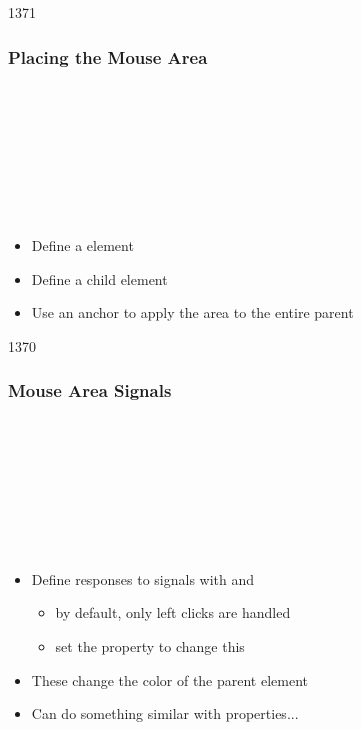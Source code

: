 
\begin{slide}{1371}\frametitle{Placing the Mouse Area}

\begin{qml}
\\
\\
\\
\\
\\
\\
\qtt{~~~~\}}\\
\qtt{\}}
\end{qml}

\begin{itemize}
\item Define a  element
\item Define a  child element
\item Use an anchor to apply the area to the entire parent
\end{itemize}

\end{slide}


\begin{slide}{1370}\frametitle{Mouse Area Signals}

\begin{qml}
\\
\\
\\
\\
\\
\\
\qtt{~~~~\}}\\
\qtt{\}}
\end{qml}

\begin{itemize}
\item Define responses to signals with  and 
  \begin{itemize}
  \item by default, only left clicks are handled
  \item set the  property to change this
  \end{itemize}
\item These change the color of the parent  element
\item Can do something similar with properties...
\end{itemize}

\end{slide}

